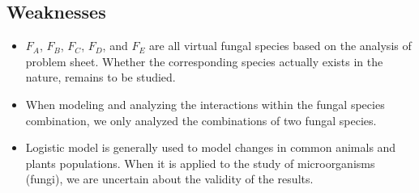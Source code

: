 \subsection{Weaknesses}
\begin{itemize}
  \item $F_A$, $F_B$, $F_C$, $F_D$, and $F_E$ are all virtual fungal species based on the analysis of problem sheet. Whether the corresponding species actually exists in the nature, remains to be studied.
  \item When modeling and analyzing the interactions within the fungal species combination, we only analyzed the combinations of two fungal species.
  \item Logistic model is generally used to model changes in common animals and plants populations. When it is applied to the study of microorganisms (fungi), we are uncertain about the validity of the results.
\end{itemize}
